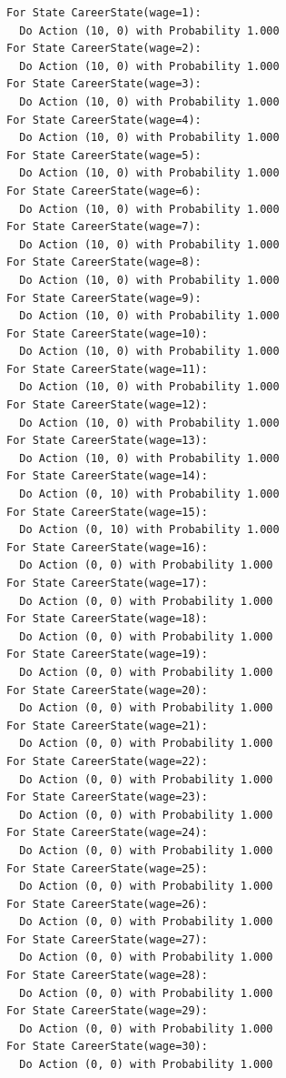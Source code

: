 \documentclass{article}[12pt]
\begin{document}
\begin{lstlisting}
For State CareerState(wage=1):
  Do Action (10, 0) with Probability 1.000
For State CareerState(wage=2):
  Do Action (10, 0) with Probability 1.000
For State CareerState(wage=3):
  Do Action (10, 0) with Probability 1.000
For State CareerState(wage=4):
  Do Action (10, 0) with Probability 1.000
For State CareerState(wage=5):
  Do Action (10, 0) with Probability 1.000
For State CareerState(wage=6):
  Do Action (10, 0) with Probability 1.000
For State CareerState(wage=7):
  Do Action (10, 0) with Probability 1.000
For State CareerState(wage=8):
  Do Action (10, 0) with Probability 1.000
For State CareerState(wage=9):
  Do Action (10, 0) with Probability 1.000
For State CareerState(wage=10):
  Do Action (10, 0) with Probability 1.000
For State CareerState(wage=11):
  Do Action (10, 0) with Probability 1.000
For State CareerState(wage=12):
  Do Action (10, 0) with Probability 1.000
For State CareerState(wage=13):
  Do Action (10, 0) with Probability 1.000
For State CareerState(wage=14):
  Do Action (0, 10) with Probability 1.000
For State CareerState(wage=15):
  Do Action (0, 10) with Probability 1.000
For State CareerState(wage=16):
  Do Action (0, 0) with Probability 1.000
For State CareerState(wage=17):
  Do Action (0, 0) with Probability 1.000
For State CareerState(wage=18):
  Do Action (0, 0) with Probability 1.000
For State CareerState(wage=19):
  Do Action (0, 0) with Probability 1.000
For State CareerState(wage=20):
  Do Action (0, 0) with Probability 1.000
For State CareerState(wage=21):
  Do Action (0, 0) with Probability 1.000
For State CareerState(wage=22):
  Do Action (0, 0) with Probability 1.000
For State CareerState(wage=23):
  Do Action (0, 0) with Probability 1.000
For State CareerState(wage=24):
  Do Action (0, 0) with Probability 1.000
For State CareerState(wage=25):
  Do Action (0, 0) with Probability 1.000
For State CareerState(wage=26):
  Do Action (0, 0) with Probability 1.000
For State CareerState(wage=27):
  Do Action (0, 0) with Probability 1.000
For State CareerState(wage=28):
  Do Action (0, 0) with Probability 1.000
For State CareerState(wage=29):
  Do Action (0, 0) with Probability 1.000
For State CareerState(wage=30):
  Do Action (0, 0) with Probability 1.000
\end{lstlisting}
\end{document}
